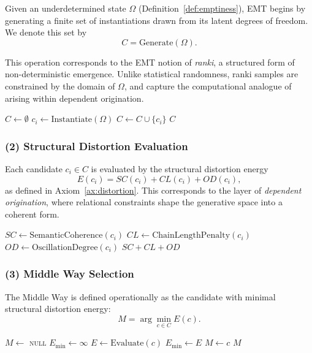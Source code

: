 \documentclass[11pt]{article}
\theoremstyle{definition}
\theoremstyle{remark}
\begin{document}
Given an underdetermined state $\Omega$ (Definition~\ref{def:emptiness}),
EMT begins by generating a finite set of instantiations drawn from
its latent degrees of freedom. We denote this set by
\[
C = \mathrm{Generate}(\Omega).
\]

This operation corresponds to the EMT notion of \emph{ranki}, a
structured form of non-deterministic emergence. Unlike statistical
randomness, ranki samples are constrained by the domain of
$\Omega$, and capture the computational analogue of 
arising within dependent origination.

\begin{algorithmic}[1]
    \State $C \gets \emptyset$
        \State $c_i \gets \mathrm{Instantiate}(\Omega)$
        \State $C \gets C \cup \{c_i\}$
    \EndFor
    \State \Return $C$
\EndProcedure
\end{algorithmic}

\subsubsection*{(2) Structural Distortion Evaluation}

Each candidate $c_i \in C$ is evaluated by the structural distortion
energy
\[
E(c_i) = SC(c_i) + CL(c_i) + OD(c_i),
\]
as defined in Axiom~\ref{ax:distortion}. This corresponds to the
layer of \emph{dependent origination}, where relational constraints
shape the generative space into a coherent form.

\begin{algorithmic}[1]
    \State $SC \gets \mathrm{SemanticCoherence}(c_i)$
    \State $CL \gets \mathrm{ChainLengthPenalty}(c_i)$
    \State $OD \gets \mathrm{OscillationDegree}(c_i)$
    \State \Return $SC + CL + OD$
\EndProcedure
\end{algorithmic}

\subsubsection*{(3) Middle Way Selection}

The Middle Way is defined operationally as the candidate with
minimal structural distortion energy:
\[
M = \arg\min_{c \in C} E(c).
\]

\begin{algorithmic}[1]
    \State $M \gets$ \textsc{null}
    \State $E_{\min} \gets \infty$
        \State $E \gets \mathrm{Evaluate}(c)$
            \State $E_{\min} \gets E$
            \State $M \gets c$
        \EndIf
    \EndFor
    \State \Return $M$
\EndProcedure
\end{algorithmic}
\end{document}
